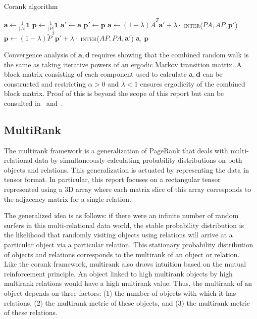     \begin{algorithm}
        \caption{Corank algorithm}
        \begin{algorithmic}[1]
            \State $\mathbf{a} \leftarrow \frac{1}{|A|}\mathbf{1}$
            \State $\mathbf{p} \leftarrow \frac{1}{|P|}\mathbf{1}$
                \State $\mathbf{a'} \leftarrow \mathbf{a}$
                \State $\mathbf{p'} \leftarrow \mathbf{p}$
                \State $\mathbf{a} \leftarrow (1-\lambda)\tilde{A}^T\mathbf{a'} + \lambda \cdot$ \textsc{inter}($PA,AP,\mathbf{p'}$) \label{op0}
                \State $\mathbf{p} \leftarrow (1-\lambda)\tilde{P}^T\mathbf{p'} + \lambda \cdot$ \textsc{inter}($AP,PA,\mathbf{a'}$) \label{op1}
            \EndWhile
            \State \Return $\mathbf{a}$, $\mathbf{p}$
        \EndFunction
        \end{algorithmic}
        \label{alg:corank}
    \end{algorithm}

Convergence analysis of $\mathbf{a},\mathbf{d}$ requires showing that the combined random walk is the same as taking iterative powers of an ergodic Markov transition matrix. A block matrix consisting of each component used to calculate $\mathbf{a},\mathbf{d}$ can be constructed and restricting $\alpha > 0$ and $\lambda < 1$ ensures ergodicity of the combined block matrix. Proof of this is beyond the scope of this report but can be consulted in~\cite{zhou2007co} and~\cite{garfield1972citation}.


\subsection{MultiRank}
The multirank framework is a generalization of PageRank that deals with multi-relational data by simultaneously calculating probability distributions on both objects and relations. This generalization is actuated by representing the data in tensor format. In particular, this report focuses on a rectangular tensor represented using a 3D array where each matrix slice of this array corresponds to the adjacency matrix for a single relation. 

The generalized idea is as follows: if there were an infinite number of random surfers in this multi-relational data world, the stable probability distribution is the likelihood that randomly visiting objects using relations will arrive at a particular object via a particular relation. This stationary probability distribution of objects and relations corresponds to the multirank of an object or relation. Like the corank framework, multirank also draws intuition based on the mutual reinforcement principle. An object linked to high multirank objects by high multirank relations would have a high multirank value. Thus, the multirank of an object depends on three factors: (1) the number of objects with which it has relations, (2) the multirank metric of these objects, and (3) the multirank metric of these relations.

